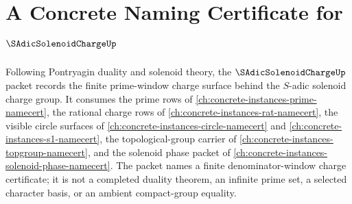 \chapter{A Concrete Naming Certificate for $\SAdicSolenoidChargeUp$}
\label{ch:concrete-instances-s-adic-solenoid-charge-namecert}

Following Pontryagin duality and solenoid theory, the $\SAdicSolenoidChargeUp$ packet records the finite prime-window charge surface behind the $S$-adic solenoid charge group. It consumes the prime rows of \autoref{ch:concrete-instances-prime-namecert}, the rational charge rows of \autoref{ch:concrete-instances-rat-namecert}, the visible circle surfaces of \autoref{ch:concrete-instances-circle-namecert} and \autoref{ch:concrete-instances-s1-namecert}, the topological-group carrier of \autoref{ch:concrete-instances-topgroup-namecert}, and the solenoid phase packet of \autoref{ch:concrete-instances-solenoid-phase-namecert}. The packet names a finite denominator-window charge certificate; it is not a completed duality theorem, an infinite prime set, a selected character basis, or an ambient compact-group equality.

